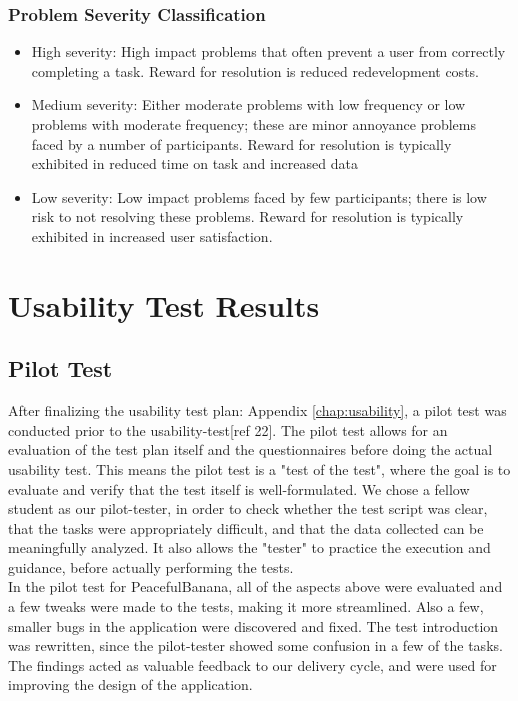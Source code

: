 \subsubsection{Problem Severity Classification}
	\begin{itemize}
		\item High severity: High impact problems that often prevent a user from correctly completing a task. Reward for resolution is reduced redevelopment costs.
		\item Medium severity: Either moderate problems with low frequency or low problems with moderate frequency; these are minor annoyance problems faced by a number of participants. Reward for resolution is typically exhibited in reduced time on task and increased data
		\item Low severity: Low impact problems faced by few participants; there is low risk to not resolving these problems. Reward for resolution is typically exhibited in increased user satisfaction.
	\end{itemize}

\section{Usability Test Results}
\subsection{Pilot Test}
After finalizing the usability test plan: Appendix \ref{chap:usability}, a pilot test was conducted prior to the usability-test[ref 22]. The pilot test allows for an evaluation of the test plan itself and the questionnaires before doing the actual usability test. This means the pilot test is a "test of the test", where the goal is to evaluate and verify that the test itself is well-formulated. We chose a fellow student as our pilot-tester, in order to check whether the test script was clear, that the tasks were appropriately difficult, and that the data collected can be meaningfully analyzed. 
It also allows the "tester" to practice the execution and guidance, before actually performing the tests. \\
In the pilot test for PeacefulBanana, all of the aspects above were evaluated and a few tweaks were made to the tests, making it more streamlined. Also a few, smaller bugs in the application were discovered and fixed. The test introduction was rewritten, since the pilot-tester showed some confusion in a few of the tasks. 
The findings acted as valuable feedback to our delivery cycle, and were used for improving the design of the application. 

